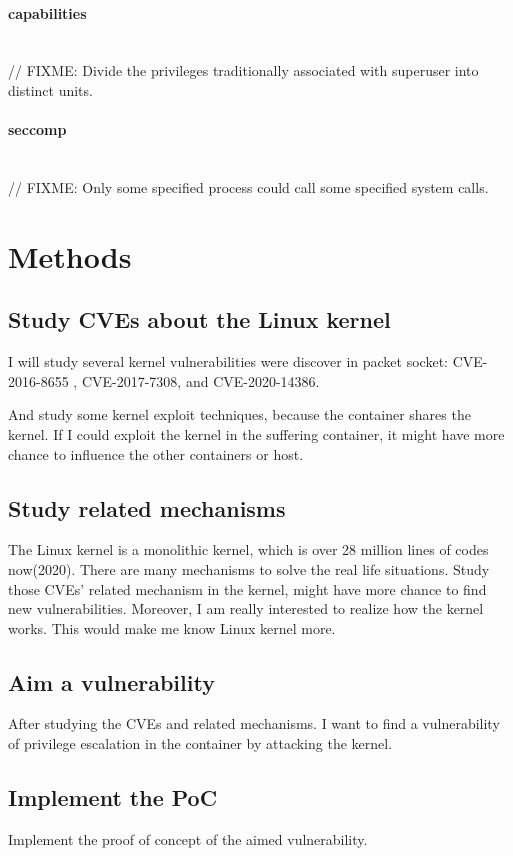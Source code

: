 \documentclass[12pt,a4paper,oneside,draft]{IEEEconf}
\begin{document}
\paragraph{capabilities}\mbox{}\\
// FIXME: Divide the privileges traditionally associated with superuser into distinct
units.

\paragraph{seccomp}\mbox{}\\
// FIXME: Only some specified process could call some specified system calls.


\section{Methods}
\subsection{Study CVEs about the Linux kernel}
I will study several kernel vulnerabilities were discover in packet socket: CVE-2016-8655
\cite{CVE-2016-8655}, CVE-2017-7308\cite{CVE-2017-7308}, and CVE-2020-14386\cite{CVE-2020-14386}.

And study some kernel exploit techniques\cite{Kernel_exploitation}, because the container shares
the kernel. If I could exploit the kernel in the suffering container, it might have more chance
to influence the other containers or host.

\subsection{Study related mechanisms}
The Linux kernel is a monolithic kernel, which is over 28 million lines of codes now(2020). There
are many mechanisms to solve the real life situations. Study those CVEs' related mechanism in the
kernel, might have more chance to find new vulnerabilities.
Moreover, I am really interested to realize how the kernel works. This would make me know Linux
kernel more.

\subsection{Aim a vulnerability}
After studying the CVEs and related mechanisms. I want to find a vulnerability of privilege
escalation in the container by attacking the kernel.

\subsection{Implement the PoC}
Implement the proof of concept of the aimed vulnerability.
\end{document}
